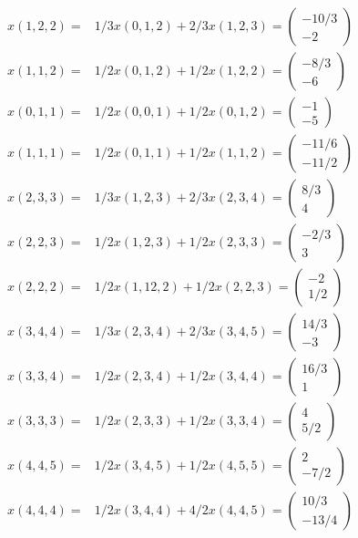 \documentclass{article}
\begin{document}
	\begin{equation}
		\begin{aligned}
			x(1,2,2)=&1/3x(0,1,2)+2/3x(1,2,3)=\left(\begin{array}{c} -10/3\\-2 \end{array}\right)\\
			x(1,1,2)=&1/2x(0,1,2)+1/2x(1,2,2)=\left(\begin{array}{c} -8/3\\-6 \end{array}\right)\\
			x(0,1,1)=&1/2x(0,0,1)+1/2x(0,1,2)=\left(\begin{array}{c} -1\\-5 \end{array}\right)\\
			x(1,1,1)=&1/2x(0,1,1)+1/2x(1,1,2)=\left(\begin{array}{c} -11/6\\-11/2 \end{array}\right)\\
			x(2,3,3)=&1/3x(1,2,3)+2/3x(2,3,4)=\left(\begin{array}{c} 8/3\\4 \end{array}\right)\\
			x(2,2,3)=&1/2x(1,2,3)+1/2x(2,3,3)=\left(\begin{array}{c} -2/3\\3 \end{array}\right)\\
			x(2,2,2)=&1/2x(1,12,2)+1/2x(2,2,3)=\left(\begin{array}{c} -2\\1/2 \end{array}\right)\\
			x(3,4,4)=&1/3x(2,3,4)+2/3x(3,4,5)=\left(\begin{array}{c} 14/3\\-3 \end{array}\right)\\
			x(3,3,4)=&1/2x(2,3,4)+1/2x(3,4,4)=\left(\begin{array}{c} 16/3\\1 \end{array}\right)\\
			x(3,3,3)=&1/2x(2,3,3)+1/2x(3,3,4)=\left(\begin{array}{c} 4\\5/2 \end{array}\right)\\
			x(4,4,5)=&1/2x(3,4,5)+1/2x(4,5,5)=\left(\begin{array}{c} 2\\-7/2 \end{array}\right)\\
			x(4,4,4)=&1/2x(3,4,4)+4/2x(4,4,5)=\left(\begin{array}{c} 10/3\\-13/4 \end{array}\right)\\
		\end{aligned}
	\end{equation}
\end{document}
